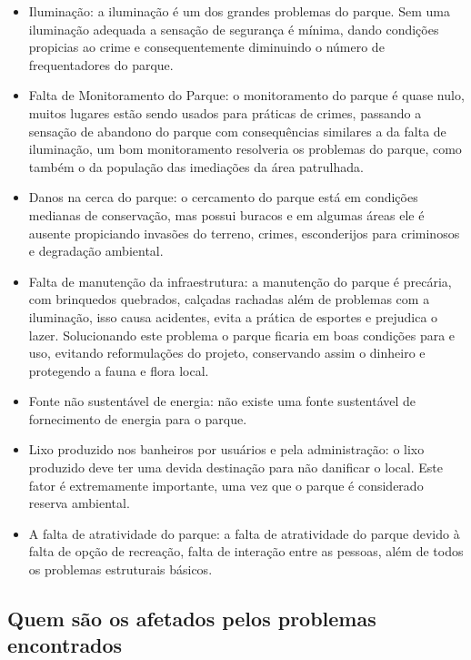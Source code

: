 \begin{itemize}
	\item Ilumina\c{c}\~ao: a ilumina\c{c}\~ao \'e um dos grandes problemas do parque. Sem uma ilumina\c{c}\~ao adequada a sensa\c{c}\~ao de seguran\c{c}a \'e m\'inima, dando condi\c{c}\~oes propicias ao crime e consequentemente diminuindo o n\'umero de frequentadores do parque.
	\item Falta de Monitoramento do Parque: o monitoramento do parque \'e quase nulo, muitos lugares estão sendo usados para pr\'aticas de crimes, passando a sensa\c{c}\~ao de abandono do parque com consequ\^encias similares a da falta de ilumina\c{c}\~ao, um bom monitoramento resolveria os problemas do parque, como tamb\'em o da popula\c{c}\~ao das imedia\c{c}\~oes da \'area patrulhada.
	\item Danos na cerca do parque: o cercamento do parque est\'a em condi\c{c}\~oes medianas de conserva\c{c}\~ao, mas possui buracos e em algumas \'areas ele \'e ausente propiciando invas\~oes do terreno, crimes, esconderijos para criminosos e degrada\c{c}\~ao ambiental.
	\item Falta de manuten\c{c}\~ao da infraestrutura: a manuten\c{c}\~ao do parque \'e prec\'aria, com brinquedos quebrados, cal\c{c}adas rachadas al\'em de problemas com a ilumina\c{c}\~ao, isso causa acidentes, evita a pr\'atica de esportes e prejudica o lazer. Solucionando este problema o parque ficaria em boas condi\c{c}\~oes para e uso, evitando reformula\c{c}\~oes do projeto, conservando assim o dinheiro e protegendo a fauna e flora local.
	\item Fonte n\~ao sustent\'avel de energia: n\~ao existe uma fonte sustent\'avel de fornecimento de energia para o parque.
	\item Lixo produzido nos banheiros por usu\'arios e pela administra\c{c}\~ao: o lixo produzido deve ter uma devida destina\c{c}\~ao para n\~ao danificar o local. Este fator \'e extremamente importante, uma vez que o parque \'e considerado reserva ambiental.
	\item A falta de atratividade do parque: a falta de atratividade do parque devido \`a falta de op\c{c}\~ao de recrea\c{c}\~ao, falta de intera\c{c}\~ao entre as pessoas, al\'em de todos os problemas estruturais b\'asicos.
\end{itemize}

\subsection{Quem s\~ao os afetados pelos problemas encontrados}
	
